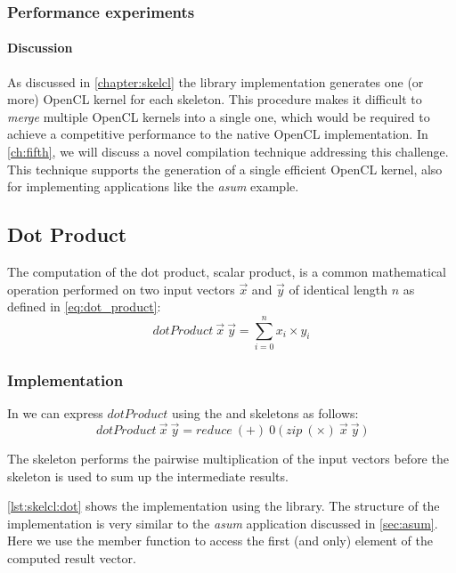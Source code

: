 \subsubsection*{Performance experiments}

\paragraph{Discussion}
As discussed in \autoref{chapter:skelcl} the \SkelCL library implementation generates one (or more) OpenCL kernel for each skeleton.
This procedure makes it difficult to \emph{merge} multiple OpenCL kernels into a single one, which would be required to achieve a competitive performance to the native OpenCL implementation.
In \autoref{ch:fifth}, we will discuss a novel compilation technique addressing this challenge.
This technique supports the generation of a single efficient OpenCL kernel, also for implementing applications like the \emph{asum} example.

\subsection{Dot Product}
\label{sec:dot}
The computation of the dot product, \aka scalar product, is a common mathematical operation performed on two input vectors $\vec{x}$ and $\vec{y}$ of identical length $n$ as defined in \autoref{eq:dot_product}:
\begin{equation}
  dotProduct\ \vec{x}\ \vec{y} = \sum_{i=0}^{n} x_i \times y_i
  \label{eq:dot_product}
\end{equation}

\subsubsection*{\SkelCL Implementation}
In \SkelCL we can express $dotProduct$ using the \zip and \reduce skeletons as follows:
\begin{equation}
  dotProduct\ \vec{x}\ \vec{y} = reduce\ (+)\ 0\ \big(\ zip\ (\times)\ \vec{x}\ \vec{y}\ \big)
\end{equation}

The \zip skeleton performs the pairwise multiplication of the input vectors before the \reduce skeleton is used to sum up the intermediate results.

\autoref{lst:skelcl:dot} shows the implementation using the \SkelCL library.
The structure of the implementation is very similar to the \emph{asum} application discussed in \autoref{sec:asum}.
Here we use the  member function to access the first (and only) element of the computed result vector.

